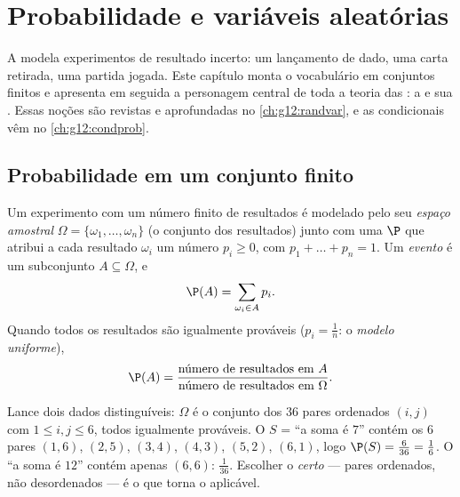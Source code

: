 \chapter{Probabilidade e variáveis aleatórias}\label{ch:g11:prob}

A  modela experimentos de resultado incerto: um lançamento
de dado, uma carta retirada, uma partida jogada. Este capítulo monta o
vocabulário em conjuntos finitos e apresenta em seguida a personagem
central de toda a teoria das : a \emph{}
e sua \emph{}. Essas noções são revistas e aprofundadas no
\cref{ch:g12:randvar}, e as  condicionais vêm no
\cref{ch:g12:condprob}.

\section{Probabilidade em um conjunto finito}

\begin{definition}\label{def:g11:prob:model}
Um experimento com um número finito de resultados é modelado pelo seu
\emph{espaço amostral}
$\Omega = \{\omega_1, \dots, \omega_n\}$ (o conjunto dos resultados)
junto com uma \emph{} $\P$ que atribui a cada resultado
$\omega_i$ um número $p_i \geq 0$, com $p_1 + \dots + p_n = 1$. Um
\emph{evento} é um subconjunto $A \subseteq \Omega$, e
\[
\P(A) = \sum_{\omega_i \in A} p_i .
\]
Quando todos os resultados são igualmente prováveis ($p_i = \frac1n$: o
\emph{modelo uniforme}),
\[
\P(A) = \frac{\text{número de resultados em } A}
{\text{número de resultados em } \Omega}.
\]
\end{definition}

\begin{example}\label{ex:g11:prob:twodice}
Lance dois dados distinguíveis: $\Omega$ é o conjunto dos $36$ pares
ordenados $(i, j)$ com $1 \leq i, j \leq 6$, todos igualmente prováveis.
O  $S$ = ``a soma é $7$'' contém os $6$ pares $(1,6)$, $(2,5)$,
$(3,4)$, $(4,3)$, $(5,2)$, $(6,1)$, logo
$\P(S) = \frac{6}{36} = \frac16$. O  ``a soma é $12$'' contém
apenas $(6,6)$:  $\frac{1}{36}$. Escolher o 
\emph{certo} --- pares ordenados, não desordenados --- é o que torna o
 aplicável.
\end{example}

